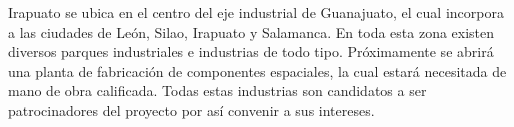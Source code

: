 Irapuato se ubica en el centro del eje industrial de Guanajuato, el cual incorpora a las ciudades de León, Silao, Irapuato y Salamanca. En toda esta zona existen diversos parques industriales e industrias de todo tipo. Próximamente se abrirá una planta de fabricación de componentes espaciales, la cual estará necesitada de mano de obra calificada. Todas estas industrias son candidatos a ser patrocinadores del proyecto por así convenir a sus intereses.
